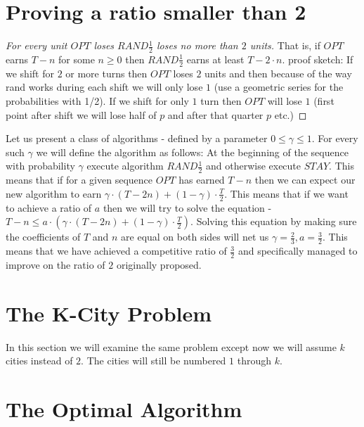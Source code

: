 \documentclass[]{article}
\newcommand{\rand}{ $ RAND \frac{1}{2} $ }
\begin{document}
\section{Proving a ratio smaller than 2}

\begin{proof}[For every unit $ OPT $ loses \rand loses no more than $ 2 $ units]

That is, if $ OPT $ earns $ T - n $ for some $ n \ge 0 $ then \rand earns at least $ T - 2 \cdot n $.
proof sketch: If we shift for $ 2 $ or more turns then $ OPT $ loses $ 2 $ units and then because of the way
rand works during each shift we will only lose $ 1 $ (use a geometric series for the probabilities with 1/2).
If we shift for only $ 1 $ turn then $ OPT $ will lose $ 1 $ (first point after shift we will lose half of $ p $
and after that quarter $ p $ etc.)

\end{proof}

Let us present a class of algorithms - defined by a parameter $ 0 \le \gamma \le 1 $.
For every such $ \gamma $ we will define the algorithm as follows:
At the beginning of the sequence with probability $ \gamma $ execute algorithm \rand and otherwise execute $ STAY $. This means that if for a given sequence $ OPT $ has earned $ T - n $ then we can expect our new algorithm to earn $ \gamma \cdot (T - 2n) + (1 - \gamma) \cdot \frac{T}{2} $. This means that if we want to achieve a ratio of $ a $ then we will try to solve the equation - $ T - n \leq a \cdot (\gamma \cdot (T - 2n) + (1 - \gamma) \cdot \frac{T}{2}) $. Solving this equation by making sure the coefficients of $ T $ and $ n $ are equal on both sides will net us $ \gamma = \frac{2}{3} , a = \frac{3}{2} $. This means that we have achieved a competitive ratio of $ \frac{3}{2} $ and specifically managed to improve on the ratio of $ 2 $ originally proposed.

\section{The K-City Problem}

In this section we will examine the same problem except now we will assume $ k $ cities instead of $ 2 $.
The cities will still be numbered $ 1 $ through $ k $.

\section{The Optimal Algorithm}
\end{document}
